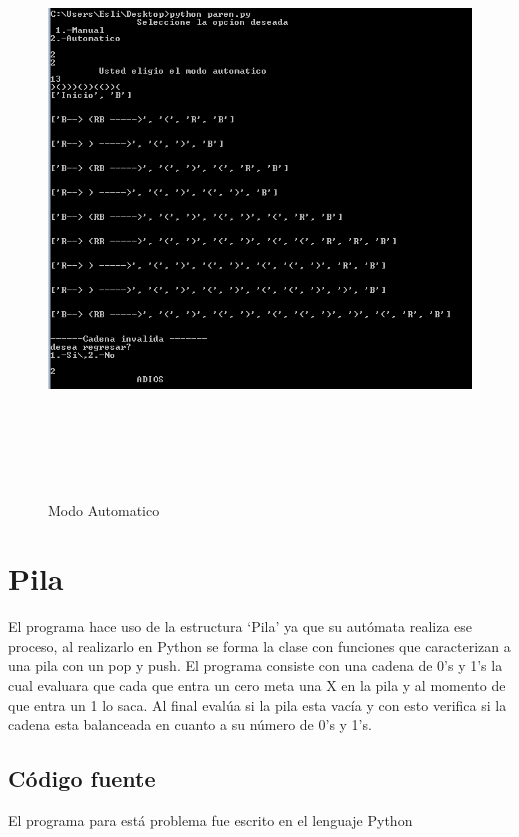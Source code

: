 \documentclass[12pt]{article}
\begin{document}
\begin{figure}[H]
\includegraphics[width=\textwidth, height=15cm]{auto_paren}
\label{fig:manual_afn}
\caption{Modo Automatico}
\end{figure}

\newpage
\section{Pila}
El programa hace uso de la estructura ‘Pila’ ya que su autómata realiza ese proceso, al realizarlo en Python se forma la clase con funciones que caracterizan a una pila con un pop y push. El programa consiste con una cadena de 0’s y 1’s la cual evaluara que cada que entra un cero meta una X en la pila y al momento de que entra un 1 lo saca. Al final evalúa si la pila esta vacía y con esto verifica si la cadena esta balanceada en cuanto a su número de 0’s y 1’s.
\subsection{Código fuente}
El programa para está problema fue escrito en el lenguaje Python\\
\end{document}

